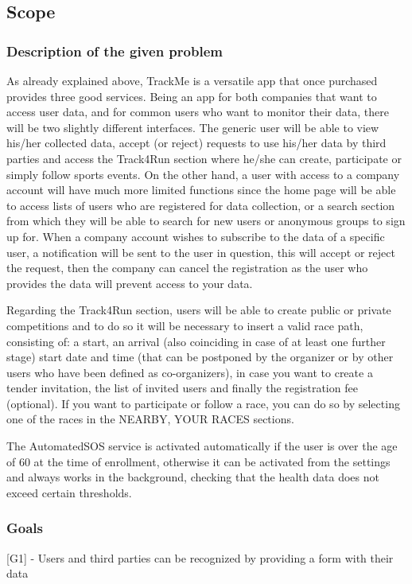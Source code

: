 \subsection{Scope}
\subsubsection{Description of the given problem}
As already explained above, TrackMe is a versatile app that once purchased provides three good services. Being an app for both companies that want to access user data, and for common users who want to monitor their data, there will be two slightly different interfaces. The generic user will be able to view his/her collected data, accept (or reject) requests to use his/her data by third parties and access the Track4Run section where he/she can create, participate or simply follow sports events. On the other hand, a user with access to a company account will have much more limited functions since the home page will be able to access lists of users who are registered for data collection, or a search section from which they will be able to search for new users or anonymous groups to sign up for. When a company account wishes to subscribe to the data of a specific user, a notification will be sent to the user in question, this will accept or reject the request, then the company can cancel the registration as the user who provides the data will prevent access to your data.

Regarding the Track4Run section, users will be able to create public or private competitions and to do so it will be necessary to insert a valid race path, consisting of: a start, an arrival (also coinciding in case of at least one further stage) start date and time (that can be postponed by the organizer or by other users who have been defined as co-organizers), in case you want to create a tender invitation, the list of invited users and finally the registration fee (optional). If you want to participate or follow a race, you can do so by selecting one of the races in the NEARBY, YOUR RACES sections.

The AutomatedSOS service is activated automatically if the user is over the age of 60 at the time of enrollment, otherwise it can be activated from the settings and always works in the background, checking that the health data does not exceed certain thresholds.
\subsubsection{Goals}
[G1] - Users and third parties can be recognized by providing a form with their data\newline

